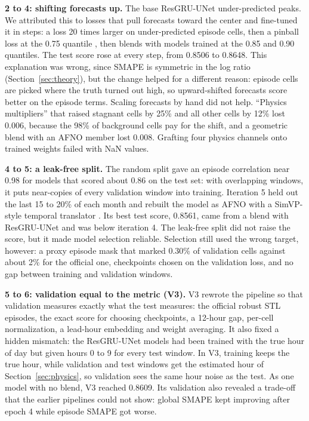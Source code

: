 \documentclass[journal]{IEEEtran}
\begin{document}
\textbf{2 to 4: shifting forecasts up.} The base ResGRU-UNet under-predicted peaks. We attributed this to losses that pull forecasts toward the center and fine-tuned it in steps: a loss 20 times larger on under-predicted episode cells, then a pinball loss at the 0.75 quantile \cite{koenker1978}, then blends with models trained at the 0.85 and 0.90 quantiles. The test score rose at every step, from 0.8506 to 0.8648. This explanation was wrong, since SMAPE is symmetric in the log ratio (Section~\ref{sec:theory}), but the change helped for a different reason: episode cells are picked where the truth turned out high, so upward-shifted forecasts score better on the episode terms. Scaling forecasts by hand did not help. ``Physics multipliers'' that raised stagnant cells by 25\% and all other cells by 12\% lost 0.006, because the 98\% of background cells pay for the shift, and a geometric blend with an AFNO member lost 0.008. Grafting four physics channels onto trained weights failed with NaN values.

\textbf{4 to 5: a leak-free split.} The random split gave an episode correlation near 0.98 for models that scored about 0.86 on the test set: with overlapping windows, it puts near-copies of every validation window into training. Iteration 5 held out the last 15 to 20\% of each month and rebuilt the model as AFNO with a SimVP-style temporal translator \cite{gao2022simvp}. Its best test score, 0.8561, came from a blend with ResGRU-UNet and was below iteration 4. The leak-free split did not raise the score, but it made model selection reliable. Selection still used the wrong target, however: a proxy episode mask that marked 0.30\% of validation cells against about 2\% for the official one, checkpoints chosen on the validation loss, and no gap between training and validation windows.

\textbf{5 to 6: validation equal to the metric (V3).} V3 rewrote the pipeline so that validation measures exactly what the test measures: the official robust STL episodes, the exact score for choosing checkpoints, a 12-hour gap, per-cell normalization, a lead-hour embedding and weight averaging. It also fixed a hidden mismatch: the ResGRU-UNet models had been trained with the true hour of day but given hours 0 to 9 for every test window. In V3, training keeps the true hour, while validation and test windows get the estimated hour of Section~\ref{sec:physics}, so validation sees the same hour noise as the test. As one model with no blend, V3 reached 0.8609. Its validation also revealed a trade-off that the earlier pipelines could not show: global SMAPE kept improving after epoch 4 while episode SMAPE got worse.
\end{document}

